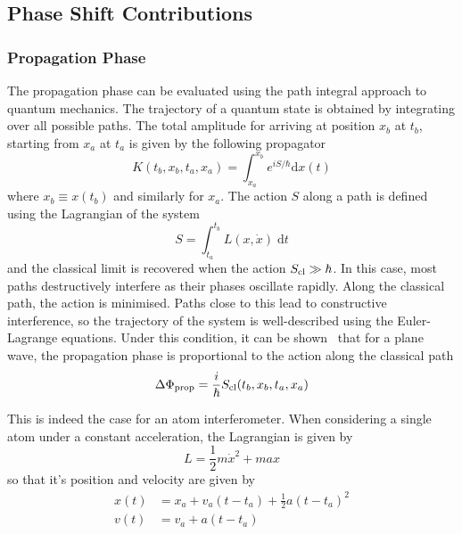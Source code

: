\subsection{Phase Shift Contributions}\label{subsec:theory_path}
\subsubsection{Propagation Phase}
The propagation phase can be evaluated using the path integral
approach to quantum mechanics. The trajectory of
a quantum state is obtained by integrating over all possible paths.
The total amplitude for arriving at position $x_b$ at $t_b$, starting
from $x_a$ at $t_a$ is given by the following propagator
\begin{equation}
  K(t_b,x_b,t_a,x_a) = \int_{x_a}^{x_b} e^{i S/\hbar} \mathrm{d}x(t)  
\end{equation}
where $x_b \equiv x(t_b)$ and similarly for $x_a$. The action $S$
along a path is
defined using the Lagrangian of the system
\begin{equation}
  S = \int_{t_a}^{t_b} L(x,\dot{x})\; \mathrm{d}t
  \label{eq:action_def}
\end{equation}
and the classical limit is recovered when the action $S_\textnormal{cl}
\gg
\hbar$. In this case, most paths destructively interfere as their
phases oscillate rapidly. Along the classical path, the action is
minimised. Paths close to this lead to constructive interference, so
the trajectory of the system is well-described using the Euler-Lagrange equations. Under this
condition, it can be shown~\cite{Storey1994} that for a plane wave,
the propagation phase is proportional to the action along the
classical path
\begin{equation}
  \label{eq:prop_phase}
  \Delta \Phi_\textnormal{prop} = \frac{i}{\hbar} S_\textnormal{cl}(t_b,x_b,t_a,x_a)
\end{equation}
\par\noindent
This is indeed the case for an atom interferometer. When considering a
single atom under a constant
acceleration, the Lagrangian is given by
\begin{equation}
  \label{eq:lagrange_acc}
  L = \frac{1}{2}m\dot{x}^2 + m a x
\end{equation}
so that it's position and velocity are given by
\begin{subequations}
\begin{align}
  x(t) &= x_a + v_a (t-t_a) + \frac{1}{2} a (t-t_a)^2 \\
  v(t) &= v_a + a(t-t_a)
\end{align}
\end{subequations}

